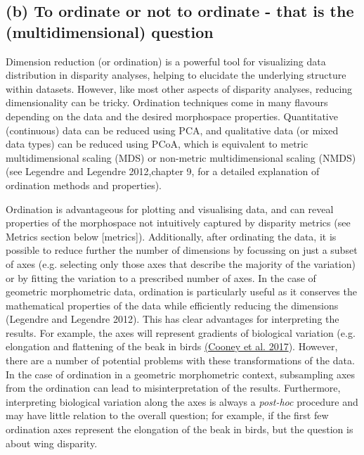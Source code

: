 \hypertarget{b-to-ordinate-or-not-to-ordinate---that-is-the-multidimensional-question}{%
\subsection{(b) To ordinate or not to ordinate - that is the
(multidimensional)
question}\label{b-to-ordinate-or-not-to-ordinate---that-is-the-multidimensional-question}}

Dimension reduction (or ordination) is a powerful tool for visualizing data distribution in disparity analyses, helping to elucidate the underlying structure within datasets.
However, like most other aspects of disparity analyses, reducing dimensionality can be tricky.
Ordination techniques come in many flavours depending on the data and the desired morphospace properties.
Quantitative (continuous) data can be reduced using PCA, and qualitative data (or mixed data types) can be reduced using PCoA, which is equivalent to metric multidimensional scaling (MDS) or non-metric multidimensional scaling (NMDS) (see Legendre and Legendre 2012,chapter 9, for a detailed explanation of ordination methods and properties).

Ordination is advantageous for plotting and visualising data, and can reveal properties of the morphospace not intuitively captured by disparity metrics (see Metrics section below {[}metrics{]}).
Additionally, after ordinating the data, it is possible to reduce further the number of dimensions by focussing on just a subset of axes (e.g. selecting only those axes that describe the majority of the variation) or by fitting the variation to a prescribed number of axes.
In the case of geometric morphometric data, ordination is particularly useful as it conserves the mathematical properties of the data while efficiently reducing the dimensions (Legendre and Legendre 2012). %
This has clear advantages for interpreting the results. For example, the axes will represent gradients of biological variation (e.g. elongation and flattening of the beak in birds \href{https://paperpile.com/c/sTGYvp/RjqE}{(Cooney et al. 2017}).
However, there are a number of potential problems with these transformations of the data.
In the case of ordination in a geometric morphometric context, subsampling axes from the ordination can lead to misinterpretation of the results. %
Furthermore, interpreting biological variation along the axes is always a \emph{post-hoc} procedure and may have little relation to the overall question; for example, if the first few ordination axes represent the elongation of the beak in birds, but the question is about wing disparity.

